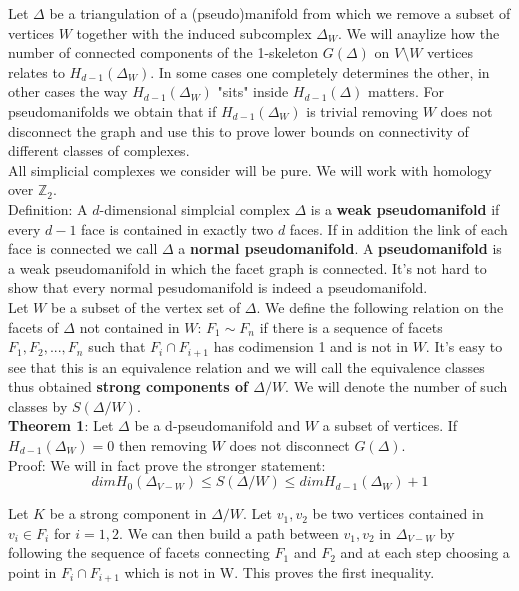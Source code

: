 \documentclass[a4paper]{article}
\begin{document}
\large {
Let $\Delta$ be a triangulation of a (pseudo)manifold from which we remove a subset of vertices $W$ together with the induced subcomplex $\Delta_W$. We will anaylize how the number of connected components of the 1-skeleton $G(\Delta)$ on $V\setminus W$ vertices relates to $H_{d-1}(\Delta_W)$. In some cases one completely determines the other, in other cases the way $H_{d-1}(\Delta_W)$ "sits" inside $H_{d-1}(\Delta)$ matters. For pseudomanifolds we obtain that if $H_{d-1}(\Delta_W)$ is trivial removing $W$ does not disconnect the graph and use this to prove lower bounds on connectivity of different classes of complexes. \\

All simplicial complexes we consider will be pure. We will work with homology over $\mathbb{Z}_2 $. \\

Definition: A $d$-dimensional simplcial complex $\Delta$ is a \textbf{weak pseudomanifold} if every $d-1$ face is contained in exactly two $d$ faces. If in addition the link of each face is connected we call $\Delta$ a \textbf{normal pseudomanifold}. A \textbf{pseudomanifold} is a weak pseudomanifold in which the facet graph is connected. It's not hard to show that every normal pesudomanifold is indeed a pseudomanifold.\\

Let $W$ be a subset of the vertex set of $\Delta$. We define the following relation on the facets of $\Delta$ not contained in $W$: $F_1 \sim  F_n$ if there is a sequence of facets $F_1, F_2,...,F_n$ such that $F_i \cap F_{i+1}$ has codimension 1 and is not in $W$. It's easy to see that this is an equivalence relation and we will call the equivalence classes thus obtained \textbf{strong components of $\Delta/W$}. We will denote the number of such classes by \textbf{$S(\Delta/W)$}. \\



\textbf{Theorem 1}: Let $\Delta$ be a d-pseudomanifold and $W$ a subset of vertices. If $H_{d-1}(\Delta_W)=0$ then removing $W$ does not disconnect $G(\Delta)$. \\


Proof: We will in fact prove the stronger statement: $$dim H_0(\Delta_{V-W})\leq S(\Delta/W) \leq dim H_{d-1}(\Delta_W)+1$$

Let $K$ be a strong component in $\Delta/W$. Let $v_1,v_2$ be two vertices contained in  $v_i\in F_i$ for $i=1,2$. We can then build a path between $v_1,v_2$  in $\Delta_{V-W}$ by following the sequence of facets connecting $F_1$ and $F_2$ and at each step choosing a point in $F_i \cap F_{i+1}$ which is not in W. This proves the first inequality. \\


}
\end{document}
